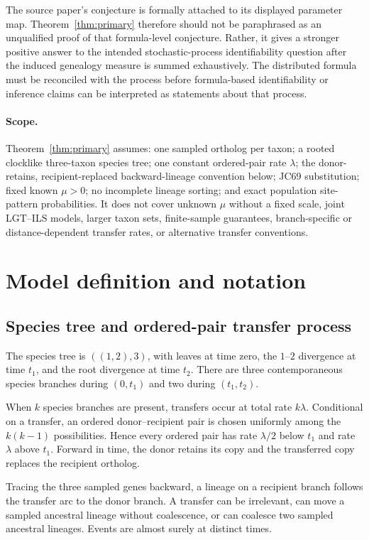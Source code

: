 \documentclass[11pt]{article}
\begin{document}
The source paper's conjecture is formally attached to its displayed parameter map.  Theorem~\ref{thm:primary} therefore should not be paraphrased as an unqualified proof of that formula-level conjecture.  Rather, it gives a stronger positive answer to the intended stochastic-process identifiability question after the induced genealogy measure is summed exhaustively.  The distributed formula must be reconciled with the process before formula-based identifiability or inference claims can be interpreted as statements about that process.

\paragraph{Scope.}
Theorem~\ref{thm:primary} assumes: one sampled ortholog per taxon; a rooted clocklike three-taxon species tree; one constant ordered-pair rate $\lambda$; the donor-retains, recipient-replaced backward-lineage convention below; JC69 substitution; fixed known $\mu>0$; no incomplete lineage sorting; and exact population site-pattern probabilities.  It does not cover unknown $\mu$ without a fixed scale, joint LGT--ILS models, larger taxon sets, finite-sample guarantees, branch-specific or distance-dependent transfer rates, or alternative transfer conventions.

\section{Model definition and notation}\label{sec:model}

\subsection{Species tree and ordered-pair transfer process}
The species tree is $((1,2),3)$, with leaves at time zero, the $1$--$2$ divergence at time $t_1$, and the root divergence at time $t_2$.  There are three contemporaneous species branches during $(0,t_1)$ and two during $(t_1,t_2)$.

When $k$ species branches are present, transfers occur at total rate $k\lambda$.  Conditional on a transfer, an ordered donor--recipient pair is chosen uniformly among the $k(k-1)$ possibilities.  Hence every ordered pair has rate $\lambda/2$ below $t_1$ and rate $\lambda$ above $t_1$.  Forward in time, the donor retains its copy and the transferred copy replaces the recipient ortholog.

Tracing the three sampled genes backward, a lineage on a recipient branch follows the transfer arc to the donor branch.  A transfer can be irrelevant, can move a sampled ancestral lineage without coalescence, or can coalesce two sampled ancestral lineages.  Events are almost surely at distinct times.
\end{document}
